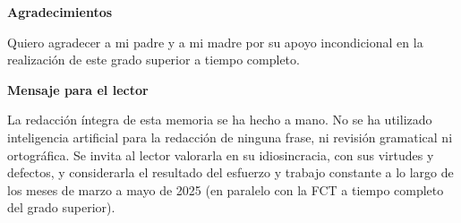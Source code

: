 \documentclass[a4paper,12pt]{report}
\begin{document}
	\clearpage
	\thispagestyle{empty}  %
	\begin{center}
		\vspace*{3cm}
		
		{\LARGE \textbf{Agradecimientos}} %
		
		\vspace{1cm}
		
		\begin{minipage}{0.8\textwidth}
			\large
			Quiero agradecer a mi padre y a mi madre por su apoyo incondicional en la realización de este grado superior a tiempo completo.
		\end{minipage}
		
		\vspace{4cm}
		
		{\LARGE \textbf{Mensaje para el lector}} %
		
		\vspace{1cm}
		
		\begin{minipage}{0.8\textwidth}
			\large
			La redacción íntegra de esta memoria se ha hecho a mano. No se ha utilizado inteligencia artificial para la redacción de ninguna frase, ni revisión gramatical ni ortográfica. Se invita al lector valorarla en su idiosincracia, con sus virtudes y defectos, y considerarla el resultado del esfuerzo y trabajo constante a lo largo de los meses de marzo a mayo de 2025 (en paralelo con la FCT a tiempo completo del grado superior). 
		\end{minipage}
		
		\vspace*{4cm}
		
		

	\end{center}
	\clearpage
	
	
	
	
	
	
	
	
	
	
	
	
	
	
	
	
	
	
	
	
	
	
	
	
	
	

	
	\tableofcontents
	\newpage
	
\end{document}
